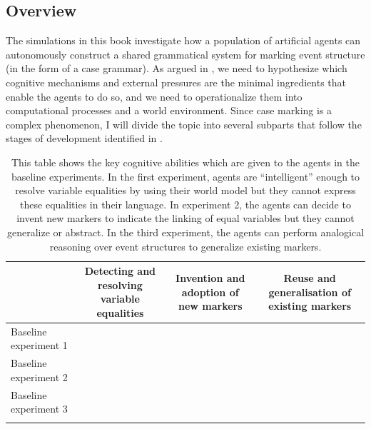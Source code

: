 \subsection{Overview}

The simulations in this book investigate how a population of artificial agents can autonomously construct a shared grammatical system for marking event structure (in the form of a case grammar). As argued in , we need to hypothesize which cognitive mechanisms and external pressures are the minimal ingredients that enable the agents to do so, and we need to operationalize them into computational processes and a world environment. Since case marking is a complex phenomenon, I will divide the topic into several subparts that follow the stages of development identified in .

\begin{table} 

\begin{tabular}[c]{p{2.5cm}ccc}
 \lsptoprule
 & \parbox{3cm}{\raggedright Detecting and resolving variable equalities} 
	&\parbox{2.5cm}{\raggedright Invention and adoption of new markers}
		&\parbox{3cm}{\raggedright Reuse and generalisation of existing markers} \\
		\midrule
\raggedright Baseline experiment 1 & \raisebox{-.5\height}{$+$}& \raisebox{-.5\height}{$-$} &\raisebox{-.5\height}{$-$} \\
\raggedright Baseline experiment 2 & \raisebox{-.5\height}{$+$}& \raisebox{-.5\height}{$+$} &\raisebox{-.5\height}{$-$} \\
\raggedright Baseline experiment 3 & \raisebox{-.5\height}{$+$} & \raisebox{-.5\height}{$+$} &\raisebox{-.5\height}{$+$}\\
 \lspbottomrule
\end{tabular}
 
\caption[Key cognitive abilities in the baseline experiments]{This table shows the key cognitive abilities which are given to the agents in the baseline experiments. In the first experiment, agents are ``intelligent'' enough to resolve variable equalities by using their world model but they cannot express these equalities in their language. In experiment 2, the agents can decide to invent new markers to indicate the linking of equal variables but they cannot generalize or abstract. In the third experiment, the agents can perform analogical reasoning over event structures to generalize existing markers.}
\label{t:repairs}
\end{table}


